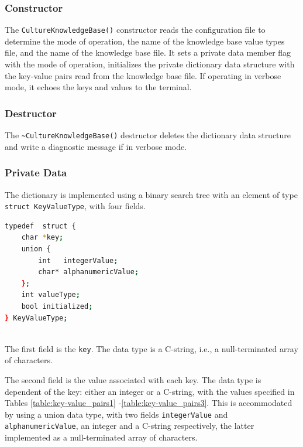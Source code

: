 \documentclass{CSSRforAfrica}
\begin{document}
\subsubsection{Constructor}

The  {\tt\small CultureKnowledgeBase()} constructor reads the configuration file to determine the mode of operation, the name of the knowledge base value types file, and  the name of the knowledge base file. It sets a private data member flag with the mode of operation, initializes the private dictionary data structure with the key-value pairs read from the knowledge base file. If operating in verbose mode, it echoes the keys and values to the terminal.


\subsubsection{Destructor}

The  {\tt\small \verb+~+CultureKnowledgeBase()} destructor deletes the dictionary data structure and write a diagnostic message if in verbose mode.


\subsubsection{Private Data}

The dictionary is implemented using a binary search tree with an element of type\\ {\small \tt struct KeyValueType}, with four fields.

\begin{lstlisting}[style=withoutNumbering, language=bash]
typedef  struct {
    char *key;
    union {
        int   integerValue;
        char* alphanumericValue;  
    };
    int valueType;
    bool initialized;
} KeyValueType;
   
\end{lstlisting}


The first field is  the {\small \tt key}. The data type  is a C-string, i.e., a null-terminated array of characters.

The second field is the value associated with each key.  The data type is dependent of  the key: either an integer  or a C-string,  with the values specified in Tables \ref{table:key-value_pairs1} -\ref{table:key-value_pairs3}. This is accommodated by using a union data type, with two fields {\small \tt integerValue} and {\small \tt alphanumericValue},  an integer and  a C-string respectively, the latter implemented as a null-terminated array of characters.
\end{document}
